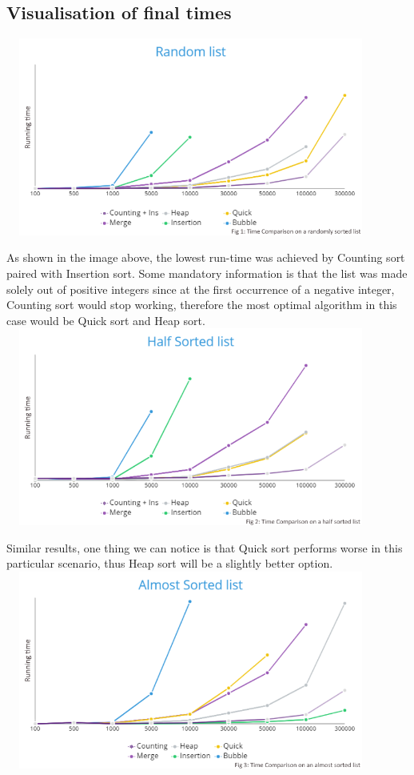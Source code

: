 \documentclass{article}
\begin{document}
\begin{center}
\section{Visualisation of final times}  

\includegraphics[width=12.2cm, height=6.5cm]{Pics/Random list.png}

 As shown in the image above, the lowest run-time was achieved by Counting sort paired with Insertion sort. Some mandatory information is that the list was made solely out of positive integers since at the first occurrence of a negative integer, Counting sort would stop working, therefore the most optimal algorithm in this case would be Quick sort and Heap sort.
\smallbreak
\includegraphics[width=12.2cm, height=6.5cm]{Pics/Half Sorted list.png}

Similar results, one thing we can notice is that Quick sort performs worse in this particular scenario, thus Heap sort will be a slightly better option.
\includegraphics[width=12.2cm, height=6.5cm]{Pics/Almost Sorted list.png}


\end{center}
\end{document}
